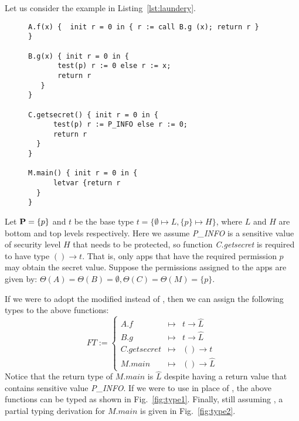{{{Let us consider the example in Listing~\ref{lst:laundery}.
\begin{figure}[ht]
\begin{lstlisting}[label={lst:laundery}, caption={An example illustrating the parameter laundering issue.}, basicstyle=\footnotesize]
A.f(x) {  init r = 0 in { r := call B.g (x); return r }
}
	
B.g(x) { init r = 0 in {
	   test(p) r := 0 else r := x;
	   return r 
   }
}

C.getsecret() { init r = 0 in {
	  test(p) r := P_INFO else r := 0;
	  return r 
  }
}

M.main() { init r = 0 in {
	  letvar {return r
  }
}
\end{lstlisting}
\end{figure}
Let $\mathbf{P}=\{p\}$ and $t$ be the base type $t =  \{\emptyset \mapsto L, \{p\} \mapsto H\}$,
where $L$ and $H$ are bottom and top levels respectively. Here we assume \textit{P\_INFO} is a sensitive value
of security level $H$ that needs to be protected, so function \textit{C.getsecret} is required to have type $() \rightarrow t$. That is, only apps that have the required permission $p$ may obtain
the secret value.
Suppose the permissions assigned to the apps are given by:  $\Theta(A) =  \Theta(B) = \emptyset, \Theta(C) = \Theta(M) = \{p\}.$

If we were to adopt the modified  instead of , then we can assign the following
types to the above functions:
\[
FT := \left\{
\begin{array}{lcl}
A.f & \mapsto & t \rightarrow \hat{L} \\
B.g & \mapsto & t \rightarrow \hat{L}\\
C.getsecret & \mapsto & () \rightarrow t\\
M.main & \mapsto  & () \rightarrow \hat{L}
\end{array}
\right.
\]
Notice that the return type of $M.main$ is $\hat{L}$ despite having a
return value that contains sensitive value \textit{P\_INFO}.
If we were to use  in place of , the above functions can
be typed as shown in Fig.~\ref{fig:type1}.
Finally, still assuming , a partial typing
derivation for $M.main$ is given in Fig.~\ref{fig:type2}.

}}}
